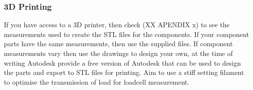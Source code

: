 \subsubsection{3D Printing}

If you have access to a 3D printer, then check (XX APENDIX x) to see the measurements used to create the STL files for the components. If your component parts have the same measurements, then use the supplied files. If component measurements vary then use the drawings to design your own, at the time of writing Autodesk provide a free version of Autodesk that can be used to design the parts and export to STL files for printing. Aim to use a stiff setting filament to optimise the transmission of load for loadcell measurement.
